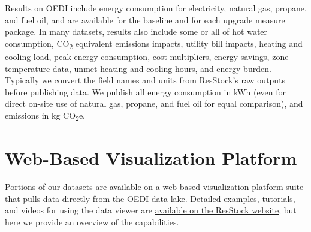 Results on OEDI include energy consumption for electricity, natural gas, propane, and fuel oil, and are available for the baseline and for each upgrade measure package. In many datasets, results also include some or all of hot water consumption, CO\textsubscript{2} equivalent emissions impacts, utility bill impacts, heating and cooling load, peak energy consumption, cost multipliers, energy savings, zone temperature data, unmet heating and cooling hours, and energy burden.
Typically we convert the field names and units from ResStock's raw outputs before publishing data. We publish all energy consumption in kWh (even for direct on-site use of natural gas, propane, and fuel oil for equal comparison), and emissions in kg CO\textsubscript{2}e. 


\section{Web-Based Visualization Platform}
Portions of our datasets are available on a web-based visualization platform suite that pulls data directly from the OEDI data lake. Detailed examples, tutorials, and videos for using the data viewer are \href{https://nrel.github.io/ResStock.github.io/}{available on the ResStock website}, but here we provide an overview of the capabilities. 

